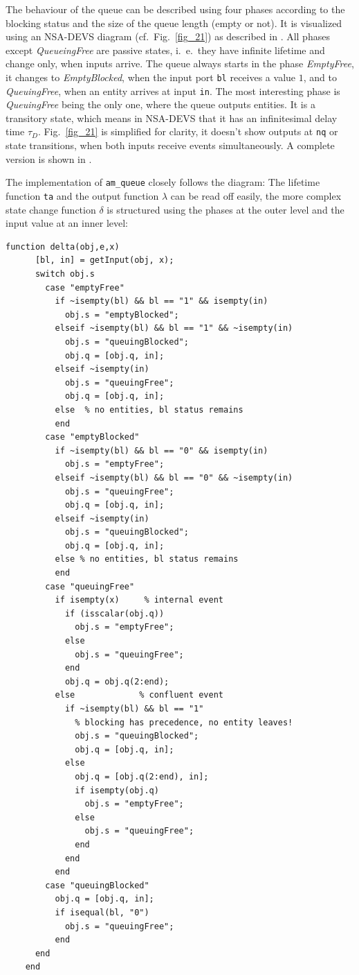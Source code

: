 \documentclass[12pt,oneside,a4paper,bibtotoc,BCOR=0pt,DIV=20]{scrreprt}
\newcommand{\cft}[1]{\mbox{\texttt{#1}}}   %
\begin{document}
The behaviour of the queue can be described using four phases according to the
blocking status and the size of the queue length (empty or not). It is
visualized using an NSA-DEVS diagram (cf.\ Fig.\ \ref{fig_21}) as described in
\cite{nsaDiagram}. All phases except \emph{QueueingFree} are passive states,
i.\ e.\ they have infinite lifetime and change only, when inputs arrive. The
queue always starts in the phase \emph{EmptyFree}, it changes to
\emph{EmptyBlocked}, when the input port \cft{bl} receives a value $1$, and to
\emph{QueuingFree}, when an entity arrives at input \cft{in}.  The most
interesting phase is \emph{QueuingFree} being the only one, where the queue
outputs entities. It is a transitory state, which means in NSA-DEVS that it has
an infinitesimal delay time $\tau_D$. Fig.\ \ref{fig_21} is simplified for
clarity, it doesn't show outputs at \cft{nq} or state transitions, when
both inputs receive events simultaneously. A complete version is shown in
\cite{nsaDiagram}.

The implementation of \cft{am\_queue} closely follows the diagram: The lifetime
function \cft{ta} and the output function $\lambda$ can be read off easily, the
more complex state change function $\delta$ is structured using the phases at
the outer level and the input value at an inner level:
\begin{lstlisting}[caption={$\delta$ function of \cft{am\_queue.m}.},captionpos=b,label=lst4]
    function delta(obj,e,x)
      [bl, in] = getInput(obj, x);
      switch obj.s
        case "emptyFree"
          if ~isempty(bl) && bl == "1" && isempty(in)
            obj.s = "emptyBlocked";
          elseif ~isempty(bl) && bl == "1" && ~isempty(in)
            obj.s = "queuingBlocked";
            obj.q = [obj.q, in];
          elseif ~isempty(in)
            obj.s = "queuingFree";
            obj.q = [obj.q, in];
          else  % no entities, bl status remains
          end
        case "emptyBlocked"
          if ~isempty(bl) && bl == "0" && isempty(in)
            obj.s = "emptyFree";
          elseif ~isempty(bl) && bl == "0" && ~isempty(in)
            obj.s = "queuingFree";
            obj.q = [obj.q, in];
          elseif ~isempty(in)
            obj.s = "queuingBlocked";
            obj.q = [obj.q, in];
          else % no entities, bl status remains
          end
        case "queuingFree"
          if isempty(x)     % internal event
            if (isscalar(obj.q))
              obj.s = "emptyFree";
            else
              obj.s = "queuingFree";
            end
            obj.q = obj.q(2:end);
          else             % confluent event
            if ~isempty(bl) && bl == "1"
              % blocking has precedence, no entity leaves!
              obj.s = "queuingBlocked";
              obj.q = [obj.q, in];
            else
              obj.q = [obj.q(2:end), in];
              if isempty(obj.q)
                obj.s = "emptyFree";
              else
                obj.s = "queuingFree";
              end
            end
          end
        case "queuingBlocked"
          obj.q = [obj.q, in];
          if isequal(bl, "0")
            obj.s = "queuingFree";
          end
      end
    end
\end{lstlisting}
\end{document}
